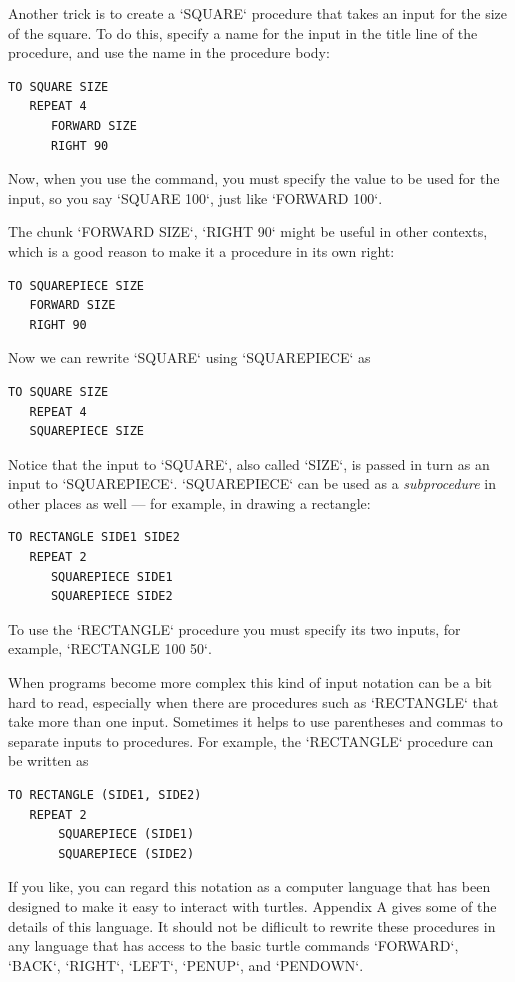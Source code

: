 \documentclass{book}
\begin{document}
Another trick is to create a \textsc{`SQUARE`} procedure that takes an input for the size of the square. To do this, specify a name for the input in the title line of the procedure, and use the name in the procedure body:

\begin{verbatim}
TO SQUARE SIZE
   REPEAT 4
      FORWARD SIZE
      RIGHT 90
\end{verbatim}
Now, when you use the command, you must specify the value to be used for the 
input, so you say \textsc{`SQUARE 100`}, just like \textsc{`FORWARD 100`}. 

The chunk \textsc{`FORWARD SIZE`}, \textsc{`RIGHT 90`}  might be useful in other 
contexts, which is a good reason to make it a procedure in its own right:


\begin{verbatim}
TO SQUAREPIECE SIZE
   FORWARD SIZE
   RIGHT 90
\end{verbatim}
Now we can rewrite \textsc{`SQUARE`} using \textsc{`SQUAREPIECE`} as

\begin{verbatim}
TO SQUARE SIZE
   REPEAT 4
   SQUAREPIECE SIZE
\end{verbatim}
Notice that the input to \textsc{`SQUARE`}, also called \textsc{`SIZE`}, 
is passed in turn as an input to \textsc{`SQUAREPIECE`}. \textsc{`SQUAREPIECE`} 
can be used as a {\em subprocedure} in other places as well --- for example, in drawing 
a rectangle:

\begin{verbatim}
TO RECTANGLE SIDE1 SIDE2
   REPEAT 2
      SQUAREPIECE SIDE1
      SQUAREPIECE SIDE2
\end{verbatim}
To use the \textsc{`RECTANGLE`} procedure you must specify its two inputs, for
example, \textsc{`RECTANGLE 100 50`}.

When programs become more complex this kind of input notation
can be a bit hard to read, especially when there are procedures such as
\textsc{`RECTANGLE`} that take more than one input. Sometimes it helps to use
parentheses and commas to separate inputs to procedures. For example,
the \textsc{`RECTANGLE`} procedure can be written as

\begin{verbatim}
TO RECTANGLE (SIDE1, SIDE2)
   REPEAT 2
       SQUAREPIECE (SIDE1)
       SQUAREPIECE (SIDE2)
\end{verbatim}
If you like, you can regard this notation as a computer language that
has been designed to make it easy to interact with turtles. Appendix
A gives some of the details of this language. It should not be diflicult
to rewrite these procedures in any language that has access to the basic
turtle commands \textsc{`FORWARD`}, \textsc{`BACK`}, \textsc{`RIGHT`}, \textsc{`LEFT`}, \textsc{`PENUP`}, and \textsc{`PENDOWN`}.
\end{document}
